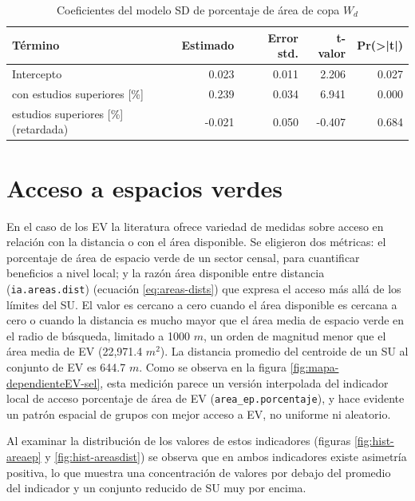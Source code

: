 \documentclass[12pt,a4paper,openany]{book}
\theoremstyle{definition}
\theoremstyle{definition}
\theoremstyle{definition}
\theoremstyle{remark}
\begin{document}
\begin{table}[H]

\caption{\label{tab:coef-sd-copaap}Coeficientes del modelo SD de porcentaje de área de copa $W_d$}
\centering
\begin{tabular}{lrrrr}
\toprule
Término & Estimado & Error std. & t-valor & Pr(>|t|)\\
\midrule
Intercepto & 0.023 & 0.011 & 2.206 & 0.027\\
con estudios superiores [\%] & 0.239 & 0.034 & 6.941 & 0.000\\
estudios superiores [\%] (retardada) & -0.021 & 0.050 & -0.407 & 0.684\\
\bottomrule
\end{tabular}
\end{table}

\section{Acceso a espacios verdes}\label{acceso-a-espacios-verdes-1}

En el caso de los EV la literatura ofrece variedad de medidas sobre
acceso en relación con la distancia o con el área disponible. Se
eligieron dos métricas: el porcentaje de área de espacio verde de un
sector censal, para cuantificar beneficios a nivel local; y la razón
área disponible entre distancia (\texttt{ia.areas.dist}) (ecuación
\eqref{eq:areas-dists}) que expresa el acceso más allá de los límites del
SU. El valor es cercano a cero cuando el área disponible es cercana a
cero o cuando la distancia es mucho mayor que el área media de espacio
verde en el radio de búsqueda, limitado a 1000 \(m\), un orden de
magnitud menor que el área media de EV (22,971.4 \(m^2\)). La distancia
promedio del centroide de un SU al conjunto de EV es 644.7 \(m\). Como
se observa en la figura \ref{fig:mapa-dependienteEV-sel}, esta medición
parece un versión interpolada del indicador local de acceso porcentaje
de área de EV (\texttt{area\_ep.porcentaje}), y hace evidente un patrón
espacial de grupos con mejor acceso a EV, no uniforme ni aleatorio.

Al examinar la distribución de los valores de estos indicadores (figuras
\ref{fig:hist-areaep} y \ref{fig:hist-areasdist}) se observa que en
ambos indicadores existe asimetría positiva, lo que muestra una
concentración de valores por debajo del promedio del indicador y un
conjunto reducido de SU muy por encima.
\end{document}
